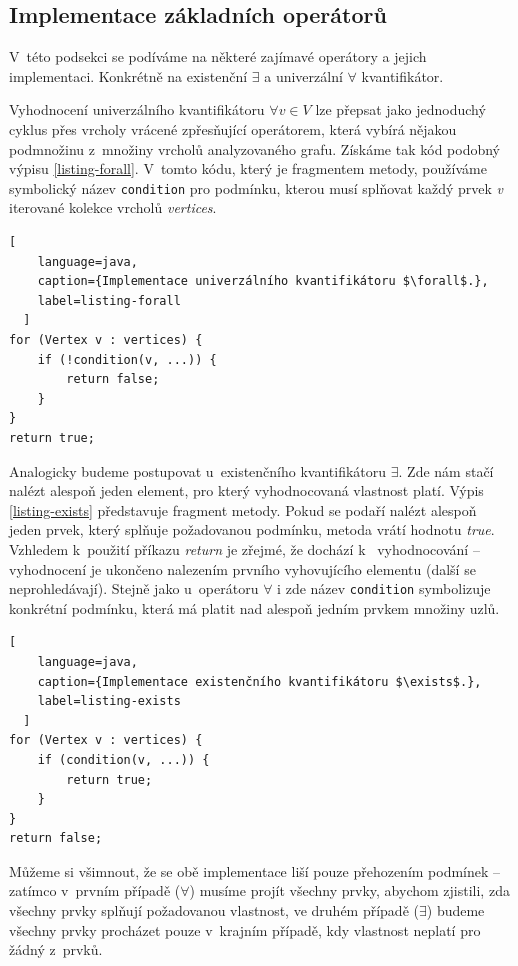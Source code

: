 \subsection{Implementace základních operátorů}
V~této podsekci se podíváme na některé zajímavé operátory a jejich implementaci. Konkrétně na existenční $\exists$ a univerzální $\forall$ kvantifikátor.

Vyhodnocení univerzálního kvantifikátoru $\forall v \in V$ lze přepsat jako jednoduchý cyklus přes vrcholy vrácené zpřesňující operátorem, která vybírá nějakou podmnožinu z~množiny vrcholů analyzovaného grafu. Získáme tak kód podobný výpisu \ref{listing-forall}. V~tomto kódu, který je fragmentem metody, používáme symbolický název \verb+condition+ pro podmínku, kterou musí splňovat každý prvek \emph{v} iterované kolekce vrcholů \emph{vertices}.
\vspace{0.5cm}
\begin{lstlisting}[
    language=java,
    caption={Implementace univerzálního kvantifikátoru $\forall$.},
    label=listing-forall
  ]
for (Vertex v : vertices) {
    if (!condition(v, ...)) {
        return false;
    }
}
return true;
\end{lstlisting}

Analogicky budeme postupovat u~existenčního kvantifikátoru $\exists$. Zde nám stačí nalézt alespoň jeden element, pro který vyhodnocovaná vlastnost platí. Výpis \ref{listing-exists} představuje fragment metody. Pokud se podaří nalézt alespoň jeden prvek, který splňuje požadovanou podmínku, metoda vrátí hodnotu \emph{true}. Vzhledem k~použití příkazu \emph{return} je zřejmé, že dochází k~ vyhodnocování -- vyhodnocení je ukončeno nalezením prvního vyhovujícího elementu (další se neprohledávají). Stejně jako u~operátoru $\forall$ i zde název \verb+condition+ symbolizuje konkrétní podmínku, která má platit nad alespoň jedním prvkem množiny uzlů.

\vspace{0.5cm}
\begin{lstlisting}[
    language=java,
    caption={Implementace existenčního kvantifikátoru $\exists$.},
    label=listing-exists
  ]
for (Vertex v : vertices) {
    if (condition(v, ...)) {
        return true;
    }
}
return false;
\end{lstlisting}

Můžeme si všimnout, že se obě implementace liší pouze přehozením podmínek -- zatímco v~prvním případě ($\forall$) musíme projít všechny prvky, abychom zjistili, zda všechny prvky splňují požadovanou vlastnost, ve druhém případě ($\exists$) budeme všechny prvky procházet pouze v~krajním případě, kdy vlastnost neplatí pro žádný z~prvků.

